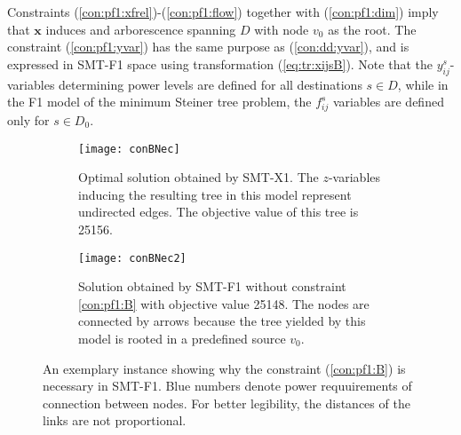     Constraints (\ref{con:pf1:xfrel})-(\ref{con:pf1:flow}) together with (\ref{con:pf1:dim}) imply that $\mathbf{x}$ induces and arborescence spanning $D$ with node $v_0$ as the root. The constraint (\ref{con:pf1:yvar}) has the same purpose as (\ref{con:dd:yvar}), and is expressed in SMT-F1 space using transformation (\ref{eq:tr:xijsB}). Note that the $y_{ij}^s$-variables determining power levels are defined for all destinations $s\in D$, while in the F1 model of the minimum Steiner tree problem, the $f_{ij}^s$ variables are defined only for $s\in D_0$. 
\begin{figure}[!htb]
    \centering
    \begin{subfigure}[b]{0.4\textwidth}
        \texttt{[image: conBNec]}
        \caption{Optimal solution obtained by SMT-X1. The $z$-variables inducing the resulting tree in this model represent undirected edges. The objective value of this tree is 25156.}
        \label{fig:BorigSMT}
    \end{subfigure}
    \hfill %
    \begin{subfigure}[b]{0.4\textwidth}
        \texttt{[image: conBNec2]}
        \caption{Solution obtained by SMT-F1 without constraint \ref{con:pf1:B} with objective value 25148. The nodes are connected by arrows because the tree yielded by this model is rooted in a predefined source $v_0$.}
        \label{fig:Bpf2}
    \end{subfigure}
    \caption{An exemplary instance showing why the constraint (\ref{con:pf1:B}) is necessary in SMT-F1. Blue numbers denote power requuirements of connection between nodes. For better legibility, the distances of the links are not proportional.} \label{fig:BProof}
\end{figure}   
